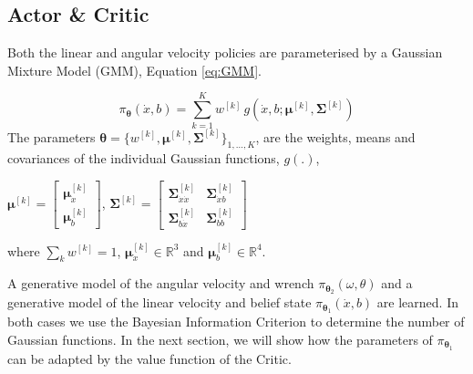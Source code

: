 \documentclass[final,3p,times,twocolumn]{elsarticle}
\newcommand{\B}{b}
\newcommand{\U}{\dot{x}}
\newcommand{\SigK}{\boldsymbol{\Sigma}^{[k]}}
\newcommand{\MuK}{\boldsymbol{\mu}^{[k]}}
\newcommand{\piK}{w^{[k]}}
\newcommand{\Param}{\boldsymbol{\theta}}
\begin{document}
\subsection{Actor \& Critic}
Both the linear and angular velocity policies are parameterised by a Gaussian Mixture Model (GMM), Equation \ref{eq:GMM}.

\begin{equation}
 \pi_{\Param}(\U,\B) = \sum\limits_{k=1}^{K} \piK \, g(\U,\B;\MuK,\SigK) \label{eq:GMM}
\end{equation}
The parameters $\Param = \{w^{[k]},\MuK,\SigK\}_{1,\dots,K}$, are the weights, means and covariances 
of the individual Gaussian functions, $g(.)$,
\begin{center}
$\MuK =  \begin{bmatrix} \MuK_{\U} \\ \MuK_{\B} \end{bmatrix}$, 
$\SigK =  \begin{bmatrix} 
	  \SigK_{\U\U} & \SigK_{\U\B} \\
	  \SigK_{\B\U} & \SigK_{\B\B}
	  \end{bmatrix}$
\end{center}
where $\sum_{k} w^{[k]} = 1$, $\MuK_{\U} \in \mathbb{R}^{3}$ and  $\MuK_{\B} \in \mathbb{R}^{4}$.

A generative model of the angular velocity and wrench $\pi_{\Param_2}(\omega,\theta)$ and a generative model 
of the linear velocity and belief state $\pi_{\Param_1}(\dot{x},b)$ are learned. 
In both cases we use the Bayesian Information Criterion to determine the number of Gaussian functions.
In the next section, we will show how the parameters of $\pi_{\Param_1}$ can be adapted by the value function of the Critic.

\end{document}
